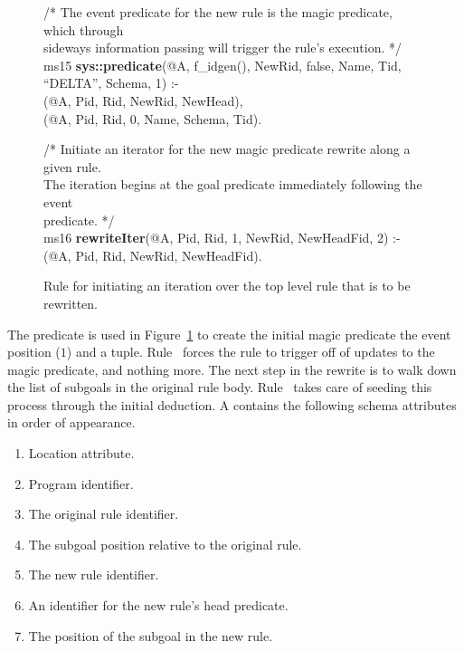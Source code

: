 \begin{figure}[!t]
\ssp
\centering
\begin{boxedminipage}{\linewidth}
/* The event predicate for the new rule is the magic predicate, which through \\
sideways information passing will trigger the rule's execution. */ \\ 
ms15 {\bf sys::predicate}(@A, f\_idgen(), NewRid, false, Name, Tid, ``DELTA'', Schema, 1) :- \\
(@A, Pid, Rid, NewRid, NewHead), \\
(@A, Pid, Rid, 0, Name, Schema, Tid).

/* Initiate an iterator for the new magic predicate rewrite along a given rule.  \\
The iteration begins at the goal predicate immediately following the event \\
predicate. */ \\
ms16 {\bf rewriteIter}(@A, Pid, Rid, 1, NewRid, NewHeadFid, 2) :- \\
(@A, Pid, Rid, NewRid, NewHeadFid). \\

\end{boxedminipage}
\caption{\label{ch:magic:fig:rewrite2} Rule for initiating an iteration over the
top level rule that is to be rewritten. }
\end{figure}

The  predicate is used in Figure~\ref{ch:magic:fig:rewrite2} to create
the initial magic predicate the event position ($1$) and a  tuple. 
Rule~ forces the rule to trigger off of updates to the magic predicate, and nothing
more. The next step in the rewrite is to walk down the list of subgoals in the original 
rule body. Rule~ takes care of seeding this process through the initial 
 deduction. A  contains the following schema attributes 
in order of appearance.
\begin{enumerate} 
  \ssp
  \item Location attribute.  
  \item Program identifier.
  \item The original rule identifier.
  \item The subgoal position relative to the original rule.
  \item The new rule identifier.
  \item An identifier for the new rule's head predicate.
  \item The position of the subgoal in the new rule.
\end{enumerate}

